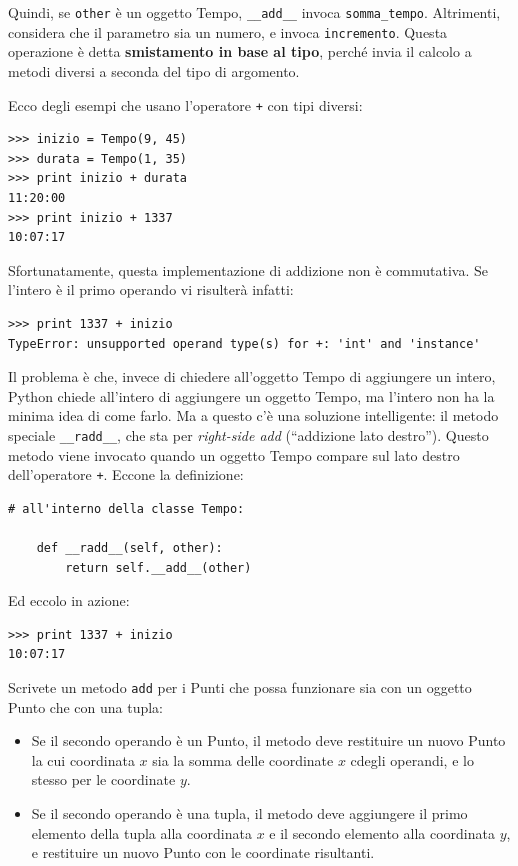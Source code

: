 \documentclass[10pt]{book}
\begin{document}
Quindi, se {\tt other} è un oggetto Tempo, \verb"__add__" invoca
\verb"somma_tempo".  Altrimenti, considera che il parametro sia un numero, e invoca {\tt incremento}.  Questa operazione è detta {\bf smistamento in base al tipo}, perché invia il calcolo a metodi diversi a seconda del tipo di argomento.

Ecco degli esempi che usano l'operatore {\tt +} con tipi diversi:

\begin{verbatim}
>>> inizio = Tempo(9, 45)
>>> durata = Tempo(1, 35)
>>> print inizio + durata
11:20:00
>>> print inizio + 1337
10:07:17
\end{verbatim}
%
Sfortunatamente, questa implementazione di addizione non è commutativa. Se l'intero è il primo operando vi risulterà infatti:

\begin{verbatim}
>>> print 1337 + inizio
TypeError: unsupported operand type(s) for +: 'int' and 'instance'
\end{verbatim}
%
Il problema è che, invece di chiedere all'oggetto Tempo di aggiungere un intero, Python chiede all'intero di aggiungere un oggetto Tempo, ma l'intero non ha la minima idea di come farlo. Ma a questo c'è una soluzione intelligente: il metodo speciale \verb"__radd__", che sta per {\em right-side add} (``addizione lato destro'').
Questo metodo viene invocato quando un oggetto Tempo compare sul lato destro dell'operatore {\tt +}.  Eccone la definizione:

\begin{verbatim}
# all'interno della classe Tempo:

    def __radd__(self, other):
        return self.__add__(other)
\end{verbatim}
%
Ed eccolo in azione:

\begin{verbatim}
>>> print 1337 + inizio
10:07:17
\end{verbatim}
%
\vspace{0.2in}
\begin{exercise}

Scrivete un metodo {\tt add} per i Punti che possa funzionare sia con un oggetto Punto che con una tupla:  

\begin{itemize}

\item Se il secondo operando è un Punto, il metodo deve restituire un nuovo Punto la cui coordinata $x$ sia la somma delle coordinate $x$ cdegli operandi, e lo stesso per le coordinate $y$.

\item Se il secondo operando è una tupla, il metodo deve aggiungere il primo elemento della tupla alla coordinata $x$ e il secondo elemento alla coordinata $y$, e restituire un nuovo Punto con le coordinate risultanti.

\end{itemize}

\end{exercise}
\end{document}
